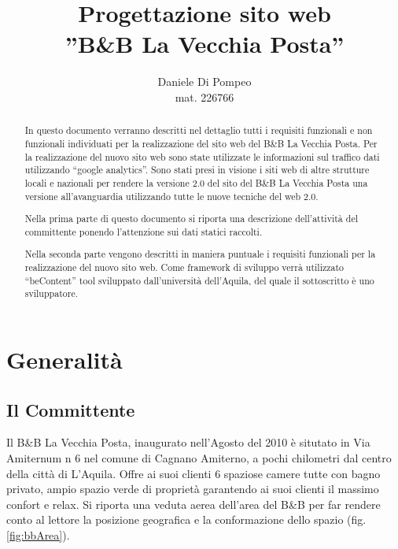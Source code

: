 \documentclass[a4paper,12pt,hidelinks]{report}
\title{Progettazione sito web\\ ''B\&B La Vecchia Posta''}
\author{Daniele Di Pompeo \\mat. 226766}
\begin{document}

\maketitle
\tableofcontents

\begin{abstract}
In questo documento verranno descritti nel dettaglio tutti i requisiti funzionali e non funzionali individuati per la realizzazione del sito web del B\&B La Vecchia Posta.
Per la realizzazione del nuovo sito web sono state utilizzate le informazioni sul traffico dati utilizzando ``google analytics''. Sono stati presi in visione i siti web di altre strutture
locali e nazionali per rendere la versione 2.0 del sito del B\&B La Vecchia Posta una versione all'avanguardia utilizzando tutte le nuove tecniche del web 2.0.
\par Nella prima parte di questo documento si riporta una descrizione dell'attività del committente ponendo l'attenzione sui dati statici raccolti.
\par Nella seconda parte vengono descritti in maniera puntuale i requisiti funzionali per la realizzazione del nuovo sito web. Come framework di sviluppo verrà utilizzato ``beContent'' tool 
sviluppato dall'università dell'Aquila, del quale il sottoscritto è uno sviluppatore.
\end{abstract}

\chapter{Generalità}

\section{Il Committente}
Il B\&B La Vecchia Posta, inaugurato nell'Agosto del 2010 è situtato in Via Amiternum n 6 nel comune di Cagnano Amiterno, a pochi chilometri dal centro della città di L'Aquila.
Offre ai suoi clienti 6 spaziose camere tutte con bagno privato, ampio spazio verde di proprietà garantendo ai suoi clienti il massimo confort e relax. 
Si riporta una veduta aerea dell'area del B\&B per far rendere conto al lettore la posizione geografica e la conformazione dello spazio (fig.\ref{fig:bbArea}). 
\end{document}
